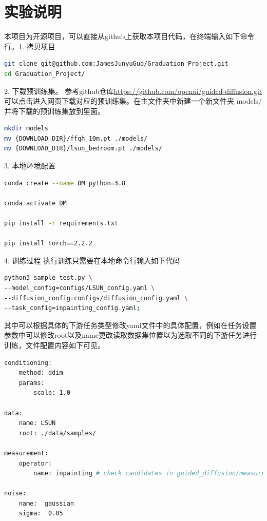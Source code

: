 \section{实验说明}
本项目为开源项目，可以直接从github上获取本项目代码，在终端输入如下命令行。1. 拷贝项目
\label{experiment instructions}
\begin{lstlisting}[language=bash]
git clone git@github.com:JamesJunyuGuo/Graduation_Project.git
cd Graduation_Project/
\end{lstlisting}
2. 下载预训练集。 参考github仓库\href{https://github.com/openai/guided-diffusion.git}{https://github.com/openai/guided-diffusion.git}可以点击进入网页下载对应的预训练集。在主文件夹中新建一个新文件夹 models/ 并将下载的预训练集放到里面。
\begin{lstlisting}[language=bash]
mkdir models
mv {DOWNLOAD_DIR}/ffqh_10m.pt ./models/
mv {DOWNLOAD_DIR}/lsun_bedroom.pt ./models/
\end{lstlisting}
3. 本地环境配置
\begin{lstlisting}[language=bash]
conda create --name DM python=3.8

conda activate DM

pip install -r requirements.txt

pip install torch==2.2.2
\end{lstlisting}
4. 训练过程   
执行训练只需要在本地命令行输入如下代码
\begin{lstlisting}[language=bash]
python3 sample_test.py \
--model_config=configs/LSUN_config.yaml \
--diffusion_config=configs/diffusion_config.yaml \
--task_config=inpainting_config.yaml;
\end{lstlisting}
其中可以根据具体的下游任务类型修改yaml文件中的具体配置，例如在任务设置参数中可以修改root以及name更改读取数据集位置以为选取不同的下游任务进行训练，文件配置内容如下可见。
\begin{lstlisting}[language=bash]
conditioning:
    method: ddim 
    params:
        scale: 1.0

data:
    name: LSUN
    root: ./data/samples/

measurement:
    operator: 
        name: inpainting # check candidates in guided_diffusion/measurements.py

noise:
    name:  gaussian 
    sigma:  0.05 
\end{lstlisting}






